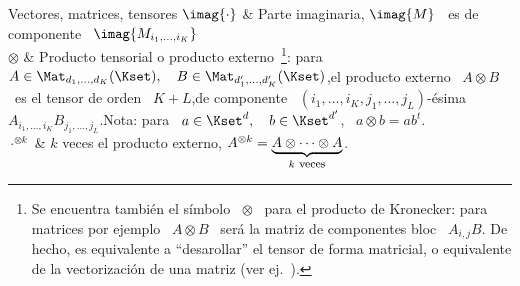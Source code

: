 \begin{notation}{Vectores, matrices, tensores}
\hline
%
$\imag{\cdot}$ & Parte imaginaria, $\imag{M}$ \ es de
componente \  $\imag{M_{i_1,\ldots,i_K}}$\\[2.5mm]
\hline
%
%
$\otimes$  &  Producto   tensorial  o  producto  externo~\footnote{Se  encuentra
  tambi\'en  el s\'imbolo  \ $\otimes$  \ para  el producto  de  Kronecker: para
  matrices por ejemplo \ $A \otimes B$  \ ser\'a la matriz de componentes bloc \
  $A_{i,j}  B$. De hecho,  es equivalente  a ``desarollar''  el tensor  de forma
  matricial,   o  equivalente  de   la  vectorizaci\'on   de  una   matriz  (ver
  ej.~\cite{MagNeu79}).}:  para $A \in  \Mat_{d_1,\ldots,d_K}(\Kset), \quad  B \in
\Mat_{d'_1,\ldots,d'_K}(\Kset)$,\newline  el producto  externo \ $A  \otimes B$ \  es el
tensor      de      orden      \      $K+L$,\newline         de      componente      \
$(i_1,\ldots,i_K,j_1,\ldots,j_L)$-\'esima          \         $A_{i_1,\ldots,i_K}
B_{j_1,\ldots,j_L} $.\vspace{1mm}\newline Nota: para \ $a \in \Kset^d, \quad
b \in \Kset^{d'}$, \ $a \otimes b = a b^t$.\\[2.5mm]
\hline
%
$\cdot^{\otimes k}$ & $k$ veces el producto externo, $A^{\otimes k}
= \underbrace{A \otimes \cdots \otimes A}_{k \:\, \mbox{\footnotesize
veces}}$.\\[2.5mm]
\hline

\end{notation}
